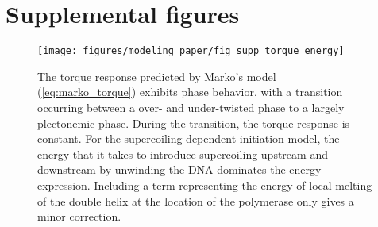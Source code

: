 \documentclass[11pt]{article}
\begin{document}
\printbibliography

\clearpage
\appendix
\titleformat{\subsection}[hang]{\bfseries}{\thesubsection}{0em}{\;\;}
\renewcommand{\appendixpagename}{Supplemental information}
\renewcommand{\thefigure}{S\arabic{figure}}
\renewcommand{\theequation}{S\arabic{equation}}
\setcounter{equation}{0}
\setcounter{figure}{0}
\appendixpage

\section{Supplemental figures}
\FloatBarrier
\begin{figure}[htbp]
    \centering
    {\texttt{[image: figures/modeling\_paper/fig\_supp\_torque\_energy]}
    \label{fig:supp:torque_diagram}
    \label{fig:supp:energy_with_melting}
    }
    \caption{
         The torque response predicted by Marko's model (\cref{eq:marko_torque}) exhibits phase behavior, with a transition occurring between a over- and under-twisted phase to a largely plectonemic phase. During the transition, the torque response is constant.
         For the supercoiling-dependent initiation model, the energy that it takes to introduce supercoiling upstream and downstream by unwinding the DNA dominates the energy expression. Including a term representing the energy of local melting of the double helix at the location of the polymerase only gives a minor correction.
    }
    \label{fig:top:supp_torque_energy}
\end{figure}
\end{document}
